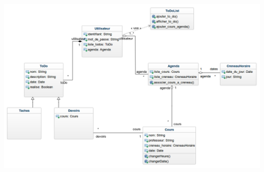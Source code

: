 \documentclass[french]{beamer}
\begin{document}
\begin{frame}
  \begin{center}
  \begin{minipage}[c]{0.6\linewidth}%
   \includegraphics[width=1\linewidth]{mdd}  %
  \end{minipage}
\end{center}
\end{frame}
\end{document}
